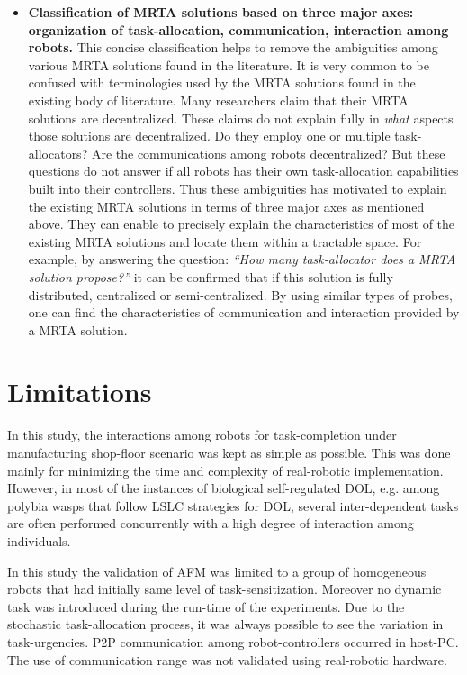 \begin{itemize}
\item \textbf{Classification of MRTA solutions based on three major axes: organization of task-allocation, communication, interaction among robots.} This concise classification helps to remove the ambiguities among various MRTA solutions found in the literature.  It is very common to be confused with terminologies used by the MRTA solutions found in the existing body of literature. Many researchers claim that their MRTA solutions are decentralized. These claims do not explain fully in \textit{what} aspects those solutions are decentralized. Do they employ one or multiple task-allocators? Are the communications among robots decentralized? But these questions do not answer if all robots has their own task-allocation capabilities built into their controllers. Thus these ambiguities has motivated to explain the existing MRTA solutions in terms of three major axes as mentioned above. They can enable to precisely  explain the characteristics of most of the existing MRTA solutions and locate them within a tractable space. For example, by answering the question: \textit{``How many task-allocator does a MRTA solution propose?''} it can be confirmed that if this solution is fully distributed, centralized or semi-centralized. By using similar types of probes, one can find the characteristics of communication and interaction provided by a MRTA solution.
\end{itemize}
\section{Limitations}
In this study, the interactions among robots for task-completion  under manufacturing shop-floor scenario was kept as simple as possible. This was done mainly for minimizing the time and complexity of real-robotic implementation. However, in most of the instances of biological self-regulated DOL, e.g. among polybia wasps that follow LSLC strategies for DOL, several inter-dependent tasks are often performed concurrently with a high degree of interaction among individuals. 

In this study the validation of AFM was limited to a group of homogeneous robots that had initially same level of task-sensitization. Moreover no dynamic task was introduced during the run-time of the experiments. Due to the stochastic task-allocation process, it was always possible to see the  variation in task-urgencies. P2P communication among robot-controllers occurred in host-PC. The use of communication range was not validated using real-robotic hardware. 

